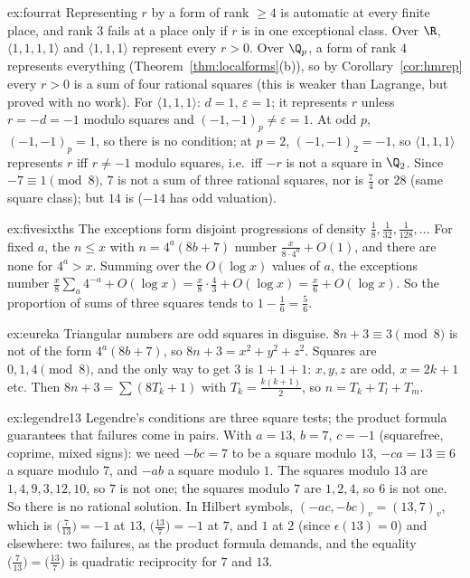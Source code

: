 \begin{solution}{ex:fourrat}
\idea Representing $r$ by a form of rank $\ge4$ is automatic at every finite place, and rank $3$ fails at a place only if
$r$ is in one exceptional class.
\writeup Over $\R$, $\langle1,1,1,1\rangle$ and $\langle1,1,1\rangle$ represent every $r>0$. Over $\Q_p$, a form of rank $4$ represents
everything (Theorem~\ref{thm:localforms}(b)), so by Corollary~\ref{cor:hmrep} every $r>0$ is a sum of four rational squares (this
is weaker than Lagrange, but proved with no work). For $\langle1,1,1\rangle$: $d=1$, $\varepsilon=1$; it represents $r$ unless $r=-d=-1$
modulo squares and $(-1,-1)_p\ne\varepsilon=1$. At odd $p$, $(-1,-1)_p=1$, so there is no condition; at $p=2$, $(-1,-1)_2=-1$, so
$\langle1,1,1\rangle$ represents $r$ iff $r\ne-1$ modulo squares, i.e.\ iff $-r$ is not a square in $\Q_2$. Since $-7\equiv1\pmod8$,
$7$ is not a sum of three rational squares, nor is $\frac74$ or $28$ (same square class); but $14$ is ($-14$ has odd valuation).
\end{solution}

\begin{solution}{ex:fivesixths}
\idea The exceptions form disjoint progressions of density $\frac18,\frac1{32},\frac1{128},\dots$
\writeup For fixed $a$, the $n\le x$ with $n=4^a(8b+7)$ number $\frac x{8\cdot4^a}+O(1)$, and there are none for $4^a>x$. Summing over the
$O(\log x)$ values of $a$, the exceptions number $\frac x8\sum_a4^{-a}+O(\log x)=\frac x8\cdot\frac43+O(\log x)=\frac x6+O(\log x)$. So
the proportion of sums of three squares tends to $1-\frac16=\frac56$.
\end{solution}

\begin{solution}{ex:eureka}
\idea Triangular numbers are odd squares in disguise.
\writeup $8n+3\equiv3\pmod8$ is not of the form $4^a(8b+7)$, so $8n+3=x^2+y^2+z^2$. Squares are $0,1,4\pmod8$, and the only way to
get $3$ is $1+1+1$: $x,y,z$ are odd, $x=2k+1$ etc. Then $8n+3=\sum(8T_k+1)$ with $T_k=\frac{k(k+1)}2$, so $n=T_k+T_l+T_m$.
\end{solution}

\begin{solution}{ex:legendre13}
\idea Legendre's conditions are three square tests; the product formula guarantees that failures come in pairs.
\writeup With $a=13$, $b=7$, $c=-1$ (squarefree, coprime, mixed signs): we need $-bc=7$ to be a square modulo $13$, $-ca=13\equiv6$ a
square modulo $7$, and $-ab$ a square modulo $1$. The squares modulo $13$ are $1,4,9,3,12,10$, so $7$ is not one; the squares modulo
$7$ are $1,2,4$, so $6$ is not one. So there is no rational solution. In Hilbert symbols, $(-ac,-bc)_v=(13,7)_v$, which is
$\bigl(\frac7{13}\bigr)=-1$ at $13$, $\bigl(\frac{13}7\bigr)=-1$ at $7$, and $1$ at $2$ (since $\epsilon(13)=0$) and elsewhere:
two failures, as the product formula demands, and the equality $\bigl(\frac7{13}\bigr)=\bigl(\frac{13}7\bigr)$ is quadratic
reciprocity for $7$ and $13$.
\end{solution}

